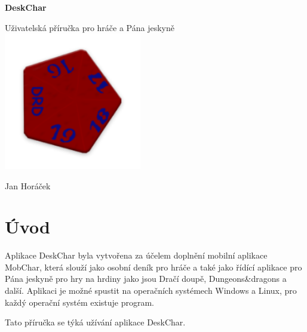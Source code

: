 \documentclass[12pt,a4paper,oneside]{article}
\begin{document}
	\begin{titlepage}	
		\begin{center}
		 	\null
			\vfil
			{\fontsize{70}{60}\selectfont \textbf{DeskChar}}
			
			
			\vspace{0.4cm}
			{\fontsize{15}{40}\selectfont
				Uživatelská příručka pro hráče a Pána jeskyně
			}
			\vfil			
			\includegraphics[width=6cm]{images/char}
			
			\vspace{8 cm}
			{\fontsize{20}{40}\selectfont
				Jan Horáček				
			}

			

		\end{center}
	\end{titlepage}

	\setcounter{page}{1}
	\tableofcontents
	\newpage
	

	\section{Úvod}
Aplikace DeskChar byla vytvořena za účelem doplnění mobilní aplikace MobChar, která slouží jako osobní deník pro hráče a také jako řídící aplikace pro Pána jeskyně pro hry na hrdiny jako jsou Dračí doupě, Dungeons\&dragons a další. Aplikaci je možné spustit na operačních systémech Windows a Linux, pro každý operační systém existuje program. \par

Tato příručka se týká užívání aplikace DeskChar.
\end{document}
